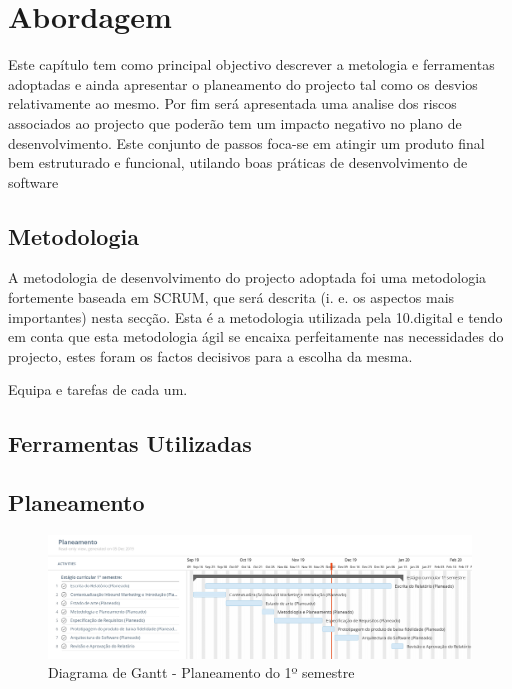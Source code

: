 \chapter{Abordagem}
\label{sec:abordagem}

Este capítulo tem como principal objectivo descrever a metologia e ferramentas adoptadas e ainda apresentar o planeamento do projecto tal como os desvios relativamente ao mesmo. Por fim será apresentada uma analise dos riscos associados ao projecto que poderão tem um impacto negativo no plano de desenvolvimento. Este conjunto de passos foca-se em atingir um produto final bem estruturado e funcional, utilando boas práticas de desenvolvimento de software


\section{Metodologia}
\label{metodologia}

A metodologia de desenvolvimento do projecto adoptada foi uma metodologia fortemente baseada em SCRUM\cite{scrum}, que será descrita (i. e. os aspectos mais importantes) nesta secção. Esta é a metodologia utilizada pela 10.digital e tendo em conta que esta metodologia ágil se encaixa perfeitamente nas necessidades do projecto, estes foram os factos decisivos para a escolha da mesma. 





Equipa e tarefas de cada um.

\section{Ferramentas Utilizadas}
\label{ferramentas}


\section{Planeamento}
\label{planeamento}

\begin{figure}[ht!]
	\begin{center}
		\includegraphics[width=1\textwidth]{img/gantt/semestre1.jpeg}
		\caption{Diagrama de Gantt - Planeamento do 1º semestre}
		\label{fig:gantt1}
	\end{center}
\end{figure}

